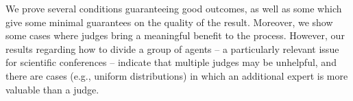 \documentclass[letterpaper]{article} %
\newcommand{\omer}[1]{\textcolor{purple}{Omer says: #1}}
\newcommand{\nick}[1]{\todo[color=kentuckyblue!40,size=footnotesize]{Nick says: #1}}
\newcommand{\nickin}[1]{\todo[color=kentuckyblue!40,inline]{Nick says: #1}}
\begin{document}
We prove several conditions guaranteeing good outcomes, as well as some which give some minimal guarantees on the quality of the result. Moreover, we show some cases where judges bring a meaningful benefit to the process. However, our results regarding how to divide a group of agents -- a particularly relevant issue for scientific conferences -- indicate that multiple judges may be unhelpful, and there are cases (e.g., uniform distributions) in which an additional expert is more valuable than a judge. %



\end{document}
